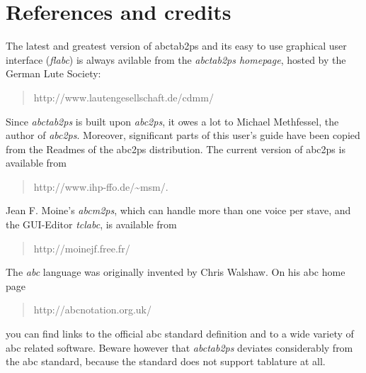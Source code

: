 \documentclass[a4paper]{article}
\begin{document}
\section{References and credits}
The latest and greatest version of abctab2ps and its easy to use graphical
user interface ({\em flabc}) is always
avilable from the {\it abctab2ps homepage}, hosted by the German
Lute Society:
\begin{quote}
{http://www.lautengesellschaft.de/cdmm/}
\end{quote}
\par
{}
Since {\it abctab2ps} is built upon {\it abc2ps}, it owes a lot to
Michael Methfessel, the author of {\it abc2ps}. Moreover, significant
parts of this user's guide have been copied from the Readmes of the
abc2ps distribution. The current version of abc2ps is available from
\begin{quote}
{http://www.ihp-ffo.de/\~{}msm/}.
\end{quote}
\par
{}
Jean F. Moine's {\it abcm2ps}, which can handle more than one
voice per stave, and the GUI-Editor {\it tclabc}, is available from
\begin{quote}
{http://moinejf.free.fr/}
\end{quote}
\par
{}
The {\it abc} language was originally invented by Chris Walshaw.
On his abc home page
\begin{quote}
{http://abcnotation.org.uk/}
\end{quote}
you can find links to the official abc standard definition and to a 
wide variety of abc related software. Beware however that {\it abctab2ps}
deviates considerably from the abc standard, because the standard
does not support tablature at all.

\printindex
\end{document}
